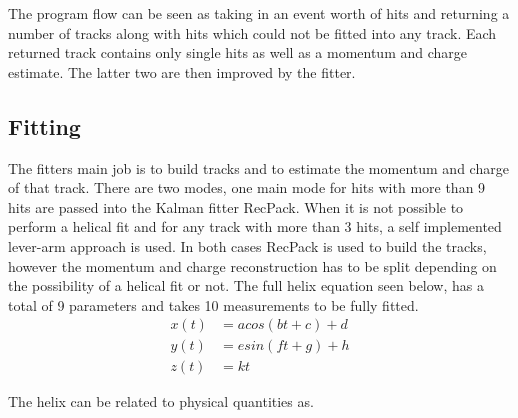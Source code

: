 The program flow can be seen as taking in an event worth of hits and returning a number of tracks along with hits which could not be fitted into any track. Each returned track contains only single hits as well as a momentum and charge estimate. The latter two are then improved by the fitter.


\subsection{Fitting}
The fitters main job is to build tracks and to estimate the momentum and charge of that track. There are two modes, one main mode for hits with more than 9 hits are passed into the Kalman fitter RecPack. When it is not possible to perform a helical fit and for any track with more than 3 hits, a self implemented lever-arm approach is used. In both cases RecPack is used to build the tracks, however the momentum and charge reconstruction has to be split depending on the possibility of a helical fit or not. The full helix equation seen below, has a total of 9 parameters and takes 10 measurements to be fully fitted.  
\begin{align}
x(t) &= acos(bt+c)+d\\
y(t) &= esin(ft+g) + h\\
z(t) &= kt
\end{align}

The helix can be related to physical quantities as.

